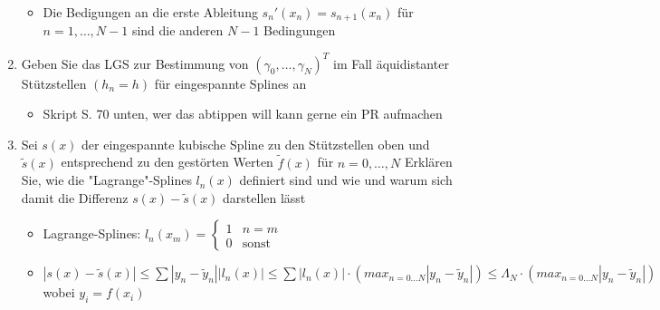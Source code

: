 \documentclass[]{article}
\begin{document}
\begin{enumerate}
\begin{itemize}
				\item Die Bedigungen an die erste Ableitung $s_n'(x_n) = s_{n+1}(x_n)$ für $n=1, \dots , N-1$ sind die anderen $N-1$ Bedingungen
			\end{itemize}
		\item Geben Sie das LGS zur Bestimmung von $(\gamma_0, \dots , \gamma_N)^T$ im Fall äquidistanter Stützstellen $(h_n = h)$ für eingespannte Splines an
			\begin{itemize}
				\item Skript S. 70 unten, wer das abtippen will kann gerne ein PR aufmachen %
			\end{itemize}
		\item Sei $s(x)$ der eingespannte kubische Spline zu den Stützstellen oben und $\tilde{s}(x)$ entsprechend zu den gestörten Werten $\tilde{f}(x)$ für $n = 0, \dots , N$ Erklären Sie, wie die "Lagrange"-Splines $l_n(x)$ definiert sind und wie und warum sich damit die Differenz $s(x) - \tilde{s}(x)$ darstellen lässt
			\begin{itemize}
				\item Lagrange-Splines: $l_n(x_m) = \begin{cases} 1 & n = m \\0 & \text{sonst} \end{cases}$
				\item $|s(x) - \tilde{s}(x)| \leq \sum |y_n - \tilde{y}_n| |l_n(x)| \leq \sum |l_n(x)| \cdot ( max_{n=0\dots N} |y_n - \tilde{y}_n| ) \leq \Lambda_N \cdot ( max_{n=0\dots N} |y_n - \tilde{y}_n| )$ wobei $y_i = f(x_i)$
			\end{itemize}
	\end{enumerate}	
\end{document}

